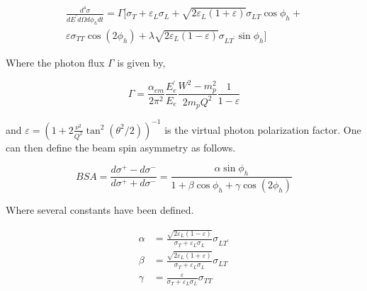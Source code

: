 \begin{equation}
\begin{split}
  \frac{d^4 \sigma}{dE^\prime d\Omega d\phi_h dt} = \Gamma \Big[ \sigma_T + \varepsilon_L \sigma_L + \sqrt{2\varepsilon_L(1+\varepsilon)} \sigma_{LT} \cos\phi_h + \\
    \varepsilon \sigma_{TT} \cos(2\phi_h) + \lambda \sqrt{2\varepsilon_L(1-\varepsilon)} \sigma_{LT^\prime} \sin \phi_h \Big]
\end{split}
\end{equation}

Where the photon flux $\Gamma$ is given by, 

\begin{equation}
  \Gamma = \frac{\alpha_{em}}{2\pi^2} \frac{E_e^\prime}{E_e} \frac{W^2-m_p^2}{2 m_p Q^2} \frac{1}{1-\varepsilon}
\end{equation}

and $\varepsilon = (1+2\frac{\nu^2}{Q^2}\tan^2(\theta^2/2))^{-1}$ is the virtual photon polarization factor.  One can then define the beam spin asymmetry as follows.

\begin{equation}
  BSA = \frac{d\sigma^+ - d\sigma^-}{d\sigma^+ + d\sigma^-} = \frac{\alpha \sin \phi_h}{1 + \beta \cos \phi_h + \gamma \cos(2\phi_h)}
\end{equation}

Where several constants have been defined.

\begin{align}
  \alpha &= \frac{\sqrt{2\varepsilon_L(1-\varepsilon)}}{\sigma_T + \varepsilon_L \sigma_L} \sigma_{LT^\prime} \\
  \beta  &= \frac{\sqrt{2\varepsilon_L(1+\varepsilon)}}{\sigma_T + \varepsilon_L \sigma_L} \sigma_{LT}        \\
  \gamma &= \frac{\varepsilon}{\sigma_T + \varepsilon_L \sigma_L} \sigma_{TT}
\end{align}



